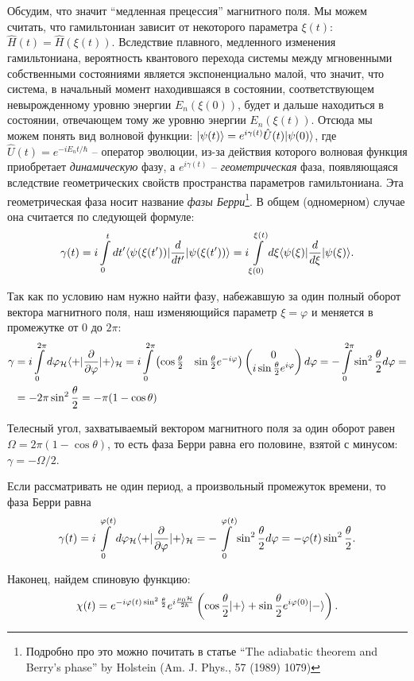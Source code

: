Обсудим, что значит ``медленная прецессия'' магнитного поля. Мы можем считать,
что гамильтониан зависит от некоторого параметра $\xi(t)$:
$\hat{H}(t)=\hat{H}(\xi(t))$. Вследствие плавного, медленного изменения
гамильтониана, вероятность квантового перехода системы между мгновенными
собственными состояниями является экспоненциально малой, что значит, что
система, в начальный момент находившаяся в состоянии, соответствующем
невырожденному уровню энергии $E_n(\xi(0))$, будет и дальше находиться в
состоянии, отвечающем тому же уровню энергии $E_n(\xi(t))$. Отсюда мы можем
понять вид волновой функции:
$\lvert\psi(t)\rangle=e^{i\gamma(t)}\hat{U}(t)\lvert\psi(0)\rangle$, где $\hat{U}(t) =
  e^{-iE_n t/\hbar}$ -- оператор эволюции, из-за действия которого волновая
функция приобретает \textit{динамическую} фазу, а $e^{i\gamma(t)}$ --
\textit{геометрическая} фаза, появляющаяся вследствие геометрических свойств
пространства параметров гамильтониана. Эта геометрическая фаза носит название
\textit{фазы Берри}\footnote{Подробно про это можно почитать в статье “The
  adiabatic theorem and Berry’s phase” by Holstein (Am. J. Phys., 57 (1989)
  1079)}. В общем (одномерном) случае она считается по следующей формуле:
\[
  \gamma(t)=i\int\limits_0^t dt'\langle\psi(\xi(t'))\rvert\frac{d}{dt'}\lvert\psi(\xi(t'))\rangle = i\int\limits_{\xi(0)}^{\xi(t)}d\xi\langle\psi(\xi)\rvert\frac{d}{d\xi}\lvert\psi(\xi)\rangle.
\]

Так как по условию нам нужно найти фазу, набежавшую за один полный оборот
вектора магнитного поля, наш изменяющийся параметр $\xi = \varphi$ и меняется в
промежутке от $0$ до $2\pi$:
\begin{align*}
  \gamma&=i\int\limits_0^{2\pi}d\varphi_{\mathcal{H}}\langle+\rvert\frac{\partial }{\partial \varphi}\lvert+\rangle_{\mathcal{H}}=i\int\limits_0^{2\pi}\begin{pmatrix} \cos\frac{\theta}{2}&\sin\frac{\theta}{2}e^{-i\varphi} \end{pmatrix}\begin{pmatrix} 0\\i\sin\frac{\theta}{2}e^{i\varphi} \end{pmatrix}d\varphi = -\int\limits_0^{2\pi}\sin^2\frac{\theta}{2}d\varphi = \\
  &=-2\pi\sin^2\frac{\theta}{2} = -\pi(1-\cos\theta)
\end{align*}

Телесный угол, захватываемый вектором магнитного поля за один оборот равен
$\Omega = 2\pi(1-\cos\theta)$, то есть фаза Берри равна его половине, взятой с
минусом: $\gamma=-\Omega/2$.

Если рассматривать не один период, а произвольный промежуток времени, то фаза
Берри равна
\[
  \gamma(t)=i\int\limits_0^{\varphi(t)}d\varphi_{\mathcal{H}}\langle+\rvert\frac{\partial }{\partial \varphi}\lvert+\rangle_{\mathcal{H}}=-\int\limits_0^{\varphi(t)}\sin^2\frac{\theta}{2}d\varphi = -\varphi(t)\sin^2\frac{\theta}{2}.
\]

Наконец, найдем спиновую функцию:
\[
  \chi(t)=e^{-i\varphi(t)\sin^2\frac{\theta}{2}}e^{i\frac{\mu_0\mathcal{H}}{2\hbar}}\left(\cos\frac{\theta}{2}\lvert+\rangle+\sin\frac{\theta}{2}e^{i\varphi(0)}\lvert-\rangle\right).
\]
\qedsq